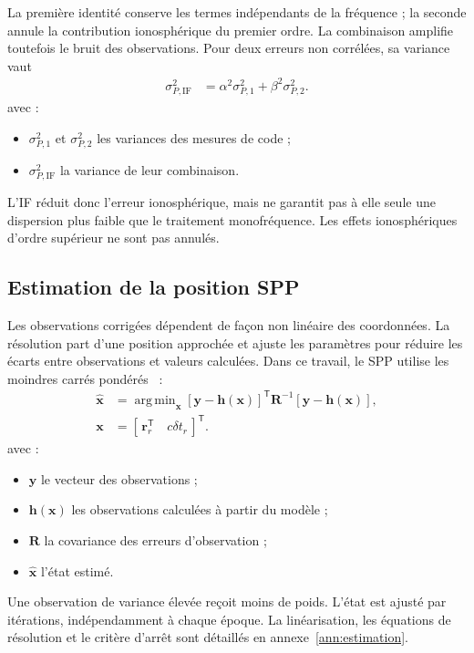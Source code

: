 La première identité conserve les termes indépendants de la fréquence ; la
seconde annule la contribution ionosphérique du premier ordre.
La combinaison amplifie toutefois le bruit des observations. Pour deux
erreurs non corrélées, sa variance vaut
\begin{align}
\sigma_{P,\mathrm{IF}}^2&=\alpha^2\sigma_{P,1}^2+\beta^2\sigma_{P,2}^2.
\label{new:if_variance}
\end{align}
avec :
\begin{itemize}
\item $\sigma_{P,1}^2$ et $\sigma_{P,2}^2$ les variances des mesures de code ;
\item $\sigma_{P,\mathrm{IF}}^2$ la variance de leur combinaison.
\end{itemize}

L'IF réduit donc l'erreur ionosphérique, mais ne garantit pas à elle seule une
dispersion plus faible que le traitement monofréquence. Les effets
ionosphériques d'ordre supérieur ne sont pas annulés.

\subsection{Estimation de la position SPP}

Les observations corrigées dépendent de façon non linéaire des coordonnées.
La résolution part d'une position approchée et ajuste les paramètres pour
réduire les écarts entre observations et valeurs calculées. Dans ce travail,
le SPP utilise les moindres carrés pondérés~\cite{verhagen2017least} :
\begin{align}
\widehat{\mathbf x}
&=\mathop{\mathrm{arg\,min}}_{\mathbf x}
[\mathbf y-\mathbf h(\mathbf x)]^{\mathsf T}\mathbf R^{-1}
[\mathbf y-\mathbf h(\mathbf x)],\\
\mathbf x&=[\,\mathbf r_r^{\mathsf T}\quad c\delta t_r\,]^{\mathsf T}.
\label{new:wls}
\end{align}
avec :
\begin{itemize}
\item $\mathbf y$ le vecteur des observations ;
\item $\mathbf h(\mathbf x)$ les observations calculées à partir du modèle ;
\item $\mathbf R$ la covariance des erreurs d'observation ;
\item $\widehat{\mathbf x}$ l'état estimé.
\end{itemize}

Une observation de variance élevée reçoit moins de poids. L'état est ajusté
par itérations, indépendamment à chaque époque. La linéarisation, les
équations de résolution et le critère d'arrêt sont détaillés en
annexe~\ref{ann:estimation}.

